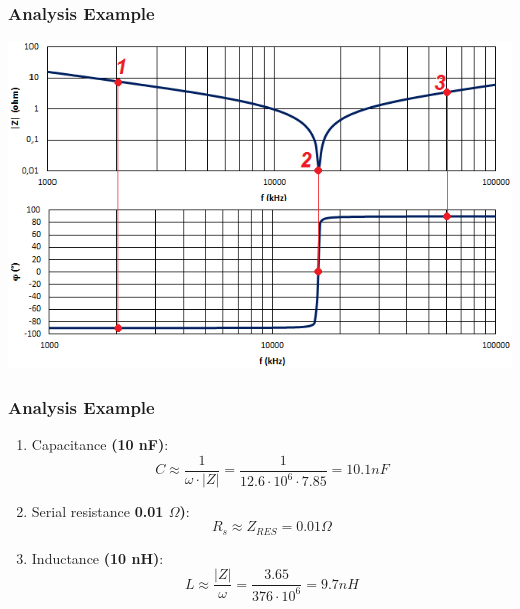 \documentclass{beamer}
\begin{document}
	\begin{frame}
    \frametitle{Analysis Example}
		
		\begin{center}
			\includegraphics[scale=0.6]{obr09_prikladC.png}
		\end{center}
	\end{frame}
	\begin{frame}
    \frametitle{Analysis Example}
		
		\begin{enumerate}
		\setcounter{enumi}{0}
			\item Capacitance \textbf{(10 nF)}: $$C\approx \frac{1}{\omega \cdot \left|Z\right|}= \frac{1}{12.6\cdot 10^6\cdot7.85}= 10.1 nF$$
			\item Serial resistance \textbf{0.01 $\Omega$)}: $$R_s \approx Z_{RES} = 0.01\Omega$$
			\item Inductance \textbf{(10 nH)}: $$L\approx \frac{\left|Z\right|}{\omega}= \frac{3.65}{376\cdot 10^6}= 9.7 nH$$
		\end{enumerate}
	\end{frame}
\end{document}
